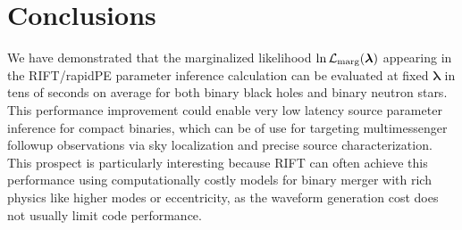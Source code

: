 \documentclass[twocolumn,prd,nofootinbib]{revtex4}
\newcommand\SkipForEarlyCirculation[1]{}
\newcommand\editremark[1]{{\color{red} #1}}
\begin{document}
\SkipForEarlyCirculation{
\section{ Results (optional?)}

*   Rerun all O2 BBHs with SEOBNRv3?  

* PP plot demo for zero-spin binaries, with profiling of full run?  

* reminder: HM for BNS break degeneracy, useful for source classification.  Show an example.

\editremark{bonus mentions}: eccentricity

Bonus code: lnLcut tapering, possibly neff tapering

Puffball in DAG every few iterations, to insure stability around edges and not overcover the core

}

\section{Conclusions}
\label{sec:conclude}
We have demonstrated that the marginalized likelihood $\ln {\cal L}_{\rm marg}(\bm{\lambda})$ appearing in the RIFT/rapidPE parameter
inference calculation can be evaluated at fixed $\bm{\lambda}$ in tens of seconds on average for
both binary black holes and binary neutron stars.  This performance improvement could enable very low latency source
parameter inference for compact binaries, which can be of use for targeting multimessenger followup observations via sky
localization and  precise source characterization.     This prospect is particularly interesting because RIFT can
often achieve this performance using computationally costly models for binary merger with rich physics like higher modes
or eccentricity, as the waveform generation cost does not usually limit code performance.   
\end{document}
